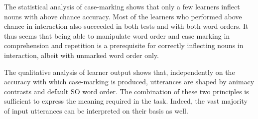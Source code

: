 The statistical analysis of case-marking shows that only a few learners inflect nouns with above chance accuracy. Most of the learners who performed above chance in interaction also succeeded in both tests and with both word orders. It thus seems that being able to manipulate word order and case marking in comprehension and repetition is a prerequisite for correctly inflecting nouns in interaction, albeit with unmarked word order only.

The qualitative analysis of learner output shows that, independently on the accuracy with which case-marking is produced, utterances are shaped by animacy contrasts and default SO word order. The combination of these two principles is sufficient to express the meaning required in the task. Indeed, the vast majority of input utterances can be interpreted on their basis as well.
